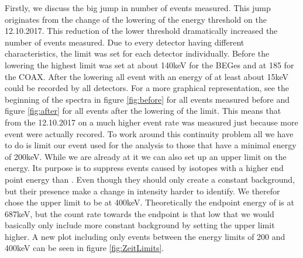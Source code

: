 \documentclass[encoding=utf8,british]{tumphthesis}
\begin{document}
Firstly, we discuss the big jump in number of events measured.
This jump originates from the change of the lowering of the energy threshold on the 12.10.2017.
This reduction of the lower threshold dramatically increased the number of events measured.
Due to every detector having different characteristics, the limit was set for each detector individually.
Before the lowering the highest limit was set at about 140keV for the BEGes and at 185 for the COAX.
After the lowering all event with an energy of at least about 15keV could be recorded by all detectors.
For a more graphical representation, see the beginning of the spectra in figure \ref{fig:before} for all events measured before and figure \ref{fig:after} for all events after the lowering of the limit. 
This means that from the 12.10.2017 on a much higher event rate was measured just because more event were actually recored.
To work around this continuity problem all we have to do is limit our event used for the analysis to those that have a minimal energy of 200keV. 
While we are already at it we can also set up an upper limit on the energy.
Its purpose is to suppress events caused by isotopes with a higher end point energy than \Kr.
Even though they should only create a constant background, but their presence make a change in intensity harder to identify.
We therefor chose the upper limit to be at 400keV.
Theoretically the endpoint energy of \Kr is at 687keV, but the count rate towards the endpoint is that low that we would basically only include more constant background by setting the upper limit higher.
A new plot including only events between the energy limits of 200 and 400keV can be seen in figure \ref{fig:ZeitLimits}.
\\
\end{document}
